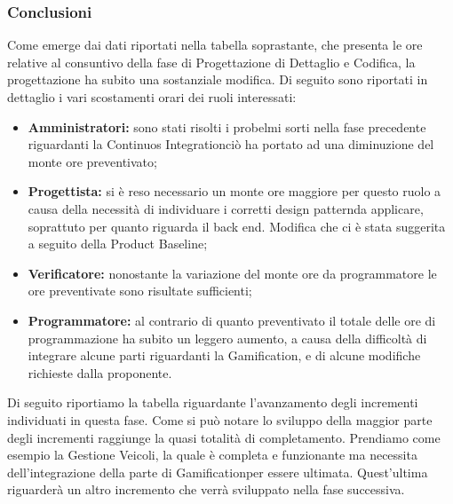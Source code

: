 \subsubsection{Conclusioni}
Come emerge dai dati riportati nella tabella soprastante, che presenta le ore relative al consuntivo della fase di Progettazione di Dettaglio e Codifica, la progettazione ha subito una sostanziale modifica. Di seguito sono riportati in dettaglio i vari scostamenti orari dei ruoli interessati:
\begin{itemize}
	\item \textbf{Amministratori:} sono stati risolti i probelmi sorti nella fase precedente riguardanti la Continuos Integration\glosp ciò ha portato ad una diminuzione del monte ore preventivato;
	\item \textbf{Progettista:} si è reso necessario un monte ore maggiore per questo ruolo a causa della necessità di individuare i corretti design pattern\glosp da applicare, soprattuto per quanto riguarda il back end\glo. Modifica che ci è stata suggerita a seguito della Product Baseline\glo; 
	\item \textbf{Verificatore:} nonostante la variazione del monte ore da programmatore le ore preventivate sono risultate sufficienti;
	\item \textbf{Programmatore:} al contrario di quanto preventivato il totale delle ore di programmazione ha subito un leggero aumento, a causa della difficoltà di integrare alcune parti riguardanti la Gamification\glo, e di alcune modifiche richieste dalla proponente.
\end{itemize}

Di seguito riportiamo la tabella riguardante l'avanzamento degli incrementi individuati in questa fase. Come si può notare lo sviluppo della maggior parte degli incrementi raggiunge la quasi totalità di completamento. Prendiamo come esempio la Gestione Veicoli, la quale è completa e funzionante ma necessita dell'integrazione della parte di Gamification\glosp per essere ultimata. Quest'ultima riguarderà un altro incremento che verrà sviluppato nella fase successiva.

